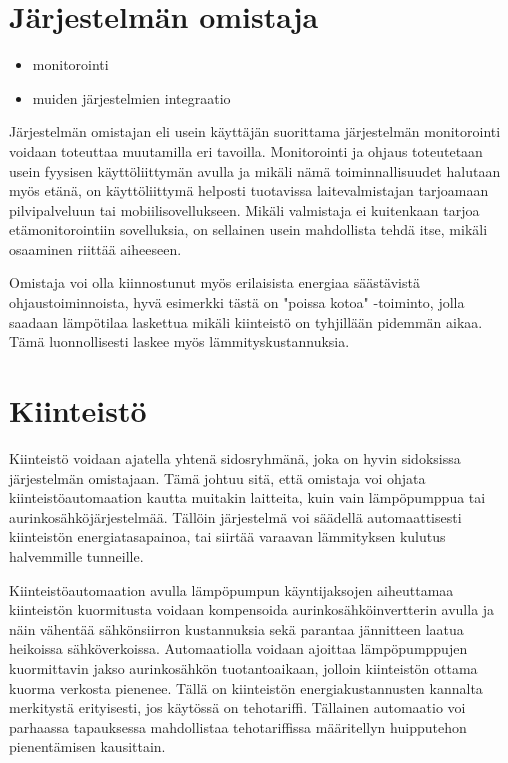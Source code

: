 \section{Järjestelmän omistaja}
  \begin{itemize}
    \item monitorointi
    \item muiden järjestelmien integraatio
  \end{itemize}

  Järjestelmän omistajan eli usein käyttäjän suorittama järjestelmän monitorointi voidaan toteuttaa muutamilla eri tavoilla. Monitorointi ja ohjaus toteutetaan usein fyysisen käyttöliittymän avulla ja mikäli nämä toiminnallisuudet halutaan myös etänä, on käyttöliittymä helposti tuotavissa laitevalmistajan tarjoamaan pilvipalveluun tai mobiilisovellukseen. Mikäli valmistaja ei kuitenkaan tarjoa etämonitorointiin sovelluksia, on sellainen usein mahdollista tehdä itse, mikäli osaaminen riittää aiheeseen.

  Omistaja voi olla kiinnostunut myös erilaisista energiaa säästävistä ohjaustoiminnoista, hyvä esimerkki tästä on "poissa kotoa" -toiminto, jolla saadaan lämpötilaa laskettua mikäli kiinteistö on tyhjillään pidemmän aikaa. Tämä luonnollisesti laskee myös lämmityskustannuksia.

\section{Kiinteistö}
  Kiinteistö voidaan ajatella yhtenä sidosryhmänä, joka on hyvin sidoksissa järjestelmän omistajaan.  Tämä johtuu sitä, että omistaja voi ohjata kiinteistöautomaation kautta muitakin laitteita, kuin vain lämpöpumppua tai aurinkosähköjärjestelmää. Tällöin järjestelmä voi säädellä automaattisesti kiinteistön energiatasapainoa, tai siirtää varaavan lämmityksen kulutus halvemmille tunneille.

  Kiinteistöautomaation avulla lämpöpumpun käyntijaksojen aiheuttamaa kiinteistön kuormitusta voidaan kompensoida aurinkosähköinvertterin avulla ja näin vähentää sähkönsiirron kustannuksia sekä parantaa jännitteen laatua heikoissa sähköverkoissa. Automaatiolla voidaan ajoittaa lämpöpumppujen kuormittavin jakso aurinkosähkön tuotantoaikaan, jolloin kiinteistön ottama kuorma verkosta pienenee. Tällä on kiinteistön energiakustannusten kannalta merkitystä erityisesti, jos käytössä on tehotariffi. Tällainen automaatio voi parhaassa tapauksessa mahdollistaa tehotariffissa määritellyn huipputehon pienentämisen kausittain.


